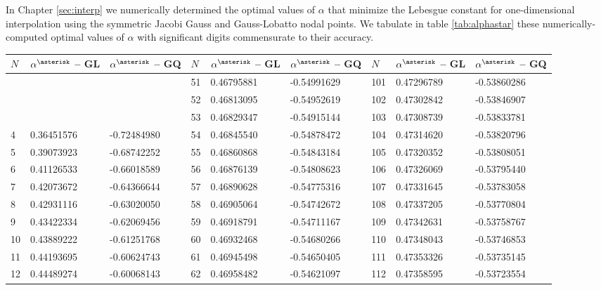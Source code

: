 \label{app:alphastar}In Chapter \ref{sec:interp} we numerically determined the
optimal values of $\alpha$ that minimize the Lebesgue constant for
one-dimensional interpolation using the symmetric Jacobi Gauss and
Gauss-Lobatto nodal points. We tabulate in table \ref{tab:alphastar} these
numerically-computed optimal values of $\alpha$ with significant digits
commensurate to their accuracy.

\begin{table}[h]
  \begin{center}
  {\scriptsize
  \begin{tabular}{|l|l|l||l|l|l||l|l|l|}
    $N$ & $\alpha^{\asterisk}$ -- GL & $\alpha^{\asterisk}$ -- GQ & $N$ &
    $\alpha^{\asterisk}$ -- GL & $\alpha^{\asterisk}$ -- GQ & $N$ &
    $\alpha^{\asterisk}$ -- GL & $\alpha^{\asterisk}$ -- GQ\\\hline
    &  &  & 51 & 0.46795881 & -0.54991629 & 101 & 0.47296789 & -0.53860286\\\hline
    &  &  & 52 & 0.46813095 & -0.54952619 & 102 & 0.47302842 & -0.53846907\\\hline
    &  &  & 53 & 0.46829347 & -0.54915144 & 103 & 0.47308739 & -0.53833781\\\hline
    4 & 0.36451576 & -0.72484980 & 54 & 0.46845540 & -0.54878472 & 104 &
    0.47314620 & -0.53820796\\\hline
    5 & 0.39073923 & -0.68742252 & 55 & 0.46860868 & -0.54843184 & 105 &
    0.47320352 & -0.53808051\\\hline
    6 & 0.41126533 & -0.66018589 & 56 & 0.46876139 & -0.54808623 & 106 &
    0.47326069 & -0.53795440\\\hline
    7 & 0.42073672 & -0.64366644 & 57 & 0.46890628 & -0.54775316 & 107 &
    0.47331645 & -0.53783058\\\hline
    8 & 0.42931116 & -0.63020050 & 58 & 0.46905064 & -0.54742672 & 108 &
    0.47337205 & -0.53770804\\\hline
    9 & 0.43422334 & -0.62069456 & 59 & 0.46918791 & -0.54711167 & 109 &
    0.47342631 & -0.53758767\\\hline
    10 & 0.43889222 & -0.61251768 & 60 & 0.46932468 & -0.54680266 & 110 &
    0.47348043 & -0.53746853\\\hline
    11 & 0.44193695 & -0.60624743 & 61 & 0.46945498 & -0.54650405 & 111 &
    0.47353326 & -0.53735145\\\hline
    12 & 0.44489274 & -0.60068143 & 62 & 0.46958482 & -0.54621097 & 112 &
    0.47358595 & -0.53723554\\\hline

\end{tabular}}
\end{center}
\end{table}
